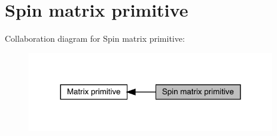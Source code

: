 \hypertarget{group__primspinmatrix}{}\section{Spin matrix primitive}
\label{group__primspinmatrix}
Collaboration diagram for Spin matrix primitive\+:\nopagebreak
\begin{figure}[H]
\begin{center}
\leavevmode
\includegraphics[width=305pt]{d6/df5/group__primspinmatrix}
\end{center}
\end{figure}
